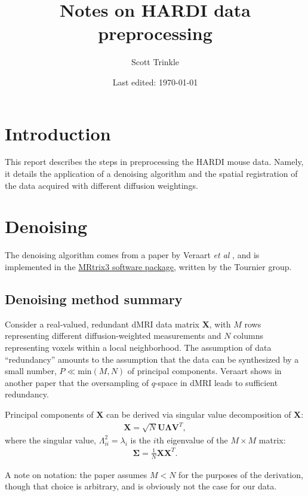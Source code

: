 \documentclass{article}
\title{Notes on HARDI data preprocessing}
\author{Scott Trinkle}
\date{Last edited: \today}
\begin{document}
\maketitle

\section{Introduction}
This report describes the steps in preprocessing the HARDI mouse data. Namely,
it details the application of a denoising algorithm and the spatial registration
of the data acquired with different diffusion weightings.

\section{Denoising}
The denoising algorithm comes from a paper by Veraart \textit{et al}
\cite{Veraart2016b}, and is implemented in the
\href{https://mrtrix.readthedocs.io/en/latest/reference/commands/dwidenoise.html#dwidenoise}{MRtrix3
  software package}, written by the Tournier group.

\subsection{Denoising method summary}
Consider a real-valued, redundant dMRI data matrix $\bm{X}$, with $M$ rows
representing different diffusion-weighted measurements and $N$ columns
representing voxels within a local neighborhood. The assumption of data
``redundancy'' amounts to the assumption that the data can be synthesized by a
small number, $P \ll \text{min}(M, N)$ of principal components. Veraart shows in
another paper \cite{Veraart2016a} that the oversampling of $q$-space in dMRI
leads to sufficient redundancy.

Principal components of $\bm{X}$ can be derived via singular value
decomposition of $\bm{X}$:
\begin{align}
  \bm{X} = \sqrt{N}\bm{U}\bm{\Lambda}\bm{V}^T,
\end{align}
where the singular value, $\Lambda_{ii}^2 = \lambda_i$ is the $i$th
eigenvalue of the $M\times M$ matrix:
\begin{align}
  \bm{\Sigma} = \frac{1}{N}\bm{X}\bm{X}^T.
\end{align}

A note on notation: the paper assumes $M < N$ for the purposes of the
derivation, though that choice is arbitrary, and is obviously not the case for
our data.
\end{document}
